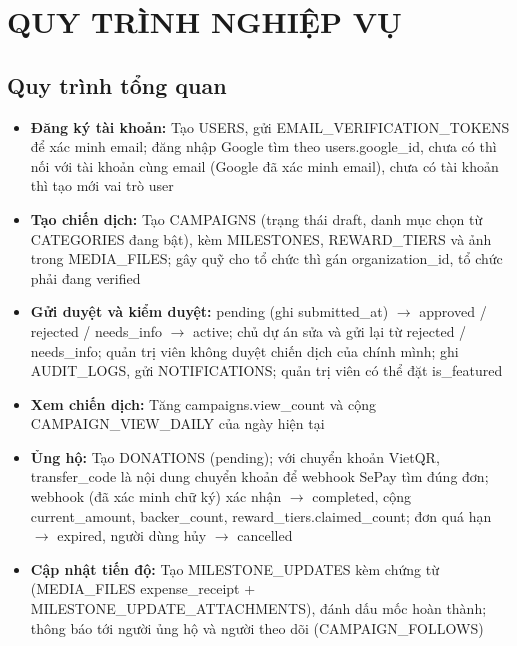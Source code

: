\section{QUY TRÌNH NGHIỆP VỤ}\label{sec:chuong4}

\subsection{Quy trình tổng quan}

\begin{itemize}
    \item \textbf{Đăng ký tài khoản:} Tạo USERS, gửi EMAIL\_\allowbreak{}VERIFICATION\_\allowbreak{}TOKENS để xác minh email; đăng nhập Google tìm theo users.google\_\allowbreak{}id, chưa có thì nối với tài khoản cùng email (Google đã xác minh email), chưa có tài khoản thì tạo mới vai trò user
    \item \textbf{Tạo chiến dịch:} Tạo CAMPAIGNS (trạng thái draft, danh mục chọn từ CATEGORIES đang bật), kèm MILESTONES, REWARD\_\allowbreak{}TIERS và ảnh trong MEDIA\_\allowbreak{}FILES; gây quỹ cho tổ chức thì gán organization\_\allowbreak{}id, tổ chức phải đang verified
    \item \textbf{Gửi duyệt và kiểm duyệt:} pending (ghi submitted\_\allowbreak{}at) $\rightarrow$ approved / rejected / needs\_\allowbreak{}info $\rightarrow$ active; chủ dự án sửa và gửi lại từ rejected / needs\_\allowbreak{}info; quản trị viên không duyệt chiến dịch của chính mình; ghi AUDIT\_\allowbreak{}LOGS, gửi NOTIFICATIONS; quản trị viên có thể đặt is\_\allowbreak{}featured
    \item \textbf{Xem chiến dịch:} Tăng campaigns.view\_\allowbreak{}count và cộng CAMPAIGN\_\allowbreak{}VIEW\_\allowbreak{}DAILY của ngày hiện tại
    \item \textbf{Ủng hộ:} Tạo DONATIONS (pending); với chuyển khoản VietQR, transfer\_\allowbreak{}code là nội dung chuyển khoản để webhook SePay tìm đúng đơn; webhook (đã xác minh chữ ký) xác nhận $\rightarrow$ completed, cộng current\_\allowbreak{}amount, backer\_\allowbreak{}count, reward\_\allowbreak{}tiers.claimed\_\allowbreak{}count; đơn quá hạn $\rightarrow$ expired, người dùng hủy $\rightarrow$ cancelled
    \item \textbf{Cập nhật tiến độ:} Tạo MILESTONE\_\allowbreak{}UPDATES kèm chứng từ (MEDIA\_\allowbreak{}FILES expense\_\allowbreak{}receipt + MILESTONE\_\allowbreak{}UPDATE\_\allowbreak{}ATTACHMENTS), đánh dấu mốc hoàn thành; thông báo tới người ủng hộ và người theo dõi (CAMPAIGN\_\allowbreak{}FOLLOWS)

\end{itemize}
